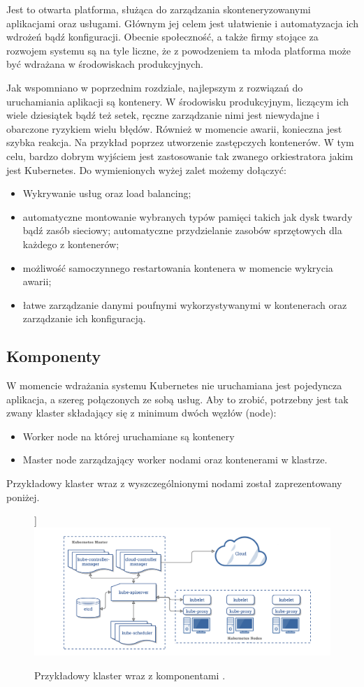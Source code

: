 \documentclass[pl,final,oneside]{mgr} %
\begin{document}
Jest to otwarta platforma, służąca do zarządzania skonteneryzowanymi aplikacjami oraz usługami. Głównym jej celem jest ułatwienie i automatyzacja ich wdrożeń bądź konfiguracji. Obecnie społeczność, a także firmy stojące za rozwojem systemu są na tyle liczne, że z powodzeniem ta młoda platforma może być wdrażana w środowiskach produkcyjnych.

Jak wspomniano w poprzednim rozdziale, najlepszym z rozwiązań do uruchamiania aplikacji są kontenery. W środowisku produkcyjnym, liczącym ich wiele dziesiątek bądź też setek, ręczne zarządzanie nimi jest niewydajne i obarczone ryzykiem wielu błędów. Również w momencie awarii, konieczna jest szybka reakcja. Na przykład poprzez utworzenie zastępczych kontenerów. W tym celu, bardzo dobrym wyjściem jest zastosowanie tak zwanego orkiestratora jakim jest Kubernetes. Do wymienionych wyżej zalet możemy dołączyć:

\begin{itemize}
	\item Wykrywanie usług oraz load balancing;
	\item automatyczne montowanie wybranych typów pamięci takich jak dysk twardy bądź zasób sieciowy;
automatyczne przydzielanie zasobów sprzętowych dla każdego z kontenerów;
	\item możliwość samoczynnego restartowania kontenera w momencie wykrycia awarii;
	\item łatwe zarządzanie danymi poufnymi wykorzystywanymi w kontenerach oraz zarządzanie ich konfiguracją.
\end{itemize}

\subsection{Komponenty}
W momencie wdrażania systemu Kubernetes nie uruchamiana jest pojedyncza aplikacja, a szereg połączonych ze sobą usług. Aby to zrobić, potrzebny jest tak zwany klaster składający się z minimum dwóch węzłów (node):
\begin{itemize}
	\item Worker node na której uruchamiane są kontenery 
	\item Master node zarządzający worker nodami oraz kontenerami w klastrze.
\end{itemize}
Przykładowy klaster wraz z wyszczególnionymi nodami został zaprezentowany poniżej.
\begin{figure}[h!]]
	\centering
	\includegraphics[width=1\linewidth]{images/components-of-kubernetes}
	\caption{Przykładowy klaster wraz z komponentami \cite{kube_doku}.}
	\label{fig:components-of-kubernetes}
\end{figure}
\end{document}
